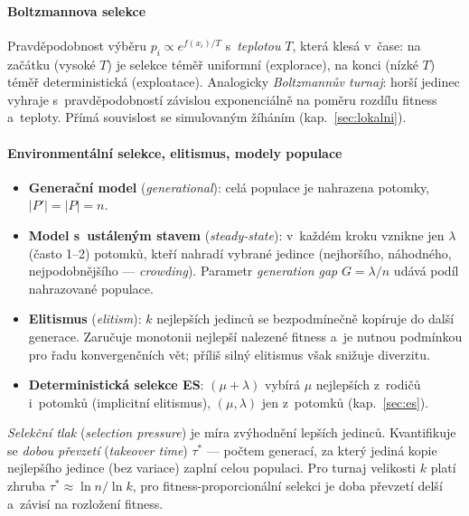\documentclass[11pt,a4paper]{article}
\theoremstyle{definition}
\begin{document}
\paragraph{Boltzmannova selekce}

Pravděpodobnost výběru $p_i \propto e^{f(x_i)/T}$ s~\emph{teplotou} $T$, která
klesá v~čase: na začátku (vysoké $T$) je selekce téměř uniformní (explorace),
na konci (nízké $T$) téměř deterministická (exploatace). Analogicky
\emph{Boltzmannův turnaj}: horší jedinec vyhraje s~pravděpodobností závislou
exponenciálně na poměru rozdílu fitness a~teploty. Přímá souvislost se
simulovaným žíháním (kap.~\ref{sec:lokalni}).

\paragraph{Environmentální selekce, elitismus, modely populace}

\begin{itemize}
\item \textbf{Generační model} (\emph{generational}): celá populace je nahrazena
  potomky, $|P'| = |P| = n$.
\item \textbf{Model s~ustáleným stavem} (\emph{steady-state}): v~každém kroku
  vznikne jen $\lambda$ (často 1--2) potomků, kteří nahradí vybrané jedince
  (nejhoršího, náhodného, nejpodobnějšího --- \emph{crowding}). Parametr
  \emph{generation gap} $G = \lambda/n$ udává podíl nahrazované populace.
\item \textbf{Elitismus} (\emph{elitism}): $k$ nejlepších jedinců se
  bezpodmínečně kopíruje do další generace. Zaručuje monotonii nejlepší
  nalezené fitness a~je nutnou podmínkou pro řadu konvergenčních vět;
  příliš silný elitismus však snižuje diverzitu.
\item \textbf{Deterministická selekce ES}: $(\mu+\lambda)$ vybírá $\mu$
  nejlepších z~rodičů i~potomků (implicitní elitismus),
  $(\mu,\lambda)$ jen z~potomků (kap.~\ref{sec:es}).
\end{itemize}

\begin{defbox}
\emph{Selekční tlak} (\emph{selection pressure}) je míra zvýhodnění lepších
jedinců. Kvantifikuje se \emph{dobou převzetí} (\emph{takeover time}) $\tau^*$ ---
počtem generací, za který jediná kopie nejlepšího jedince (bez variace) zaplní
celou populaci. Pro turnaj velikosti $k$ platí zhruba
$\tau^* \approx \ln n/\ln k$, pro fitness-proporcionální selekci je doba převzetí
delší a~závisí na rozložení fitness.
\end{defbox}
\end{document}
